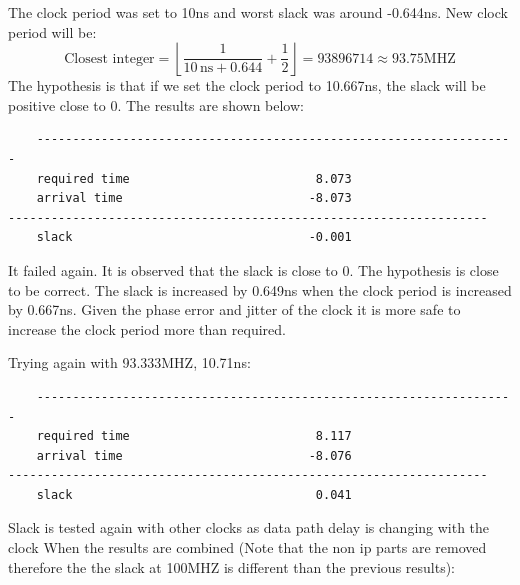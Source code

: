 \documentclass{report}
\begin{document}
The clock period was set to 10ns and worst slack was around -0.644ns. New clock period will be:
\[
\text{Closest integer} = \left\lfloor \frac{1}{10 \, \text{ns} + 0.644} + \frac{1}{2} \right\rfloor = 93896714 \approx 93.75 \text{MHZ}
\]
The hypothesis is that if we set the clock period to 10.667ns, the slack will be positive close to 0. The results are shown below:
\begin{verbatim}
    -------------------------------------------------------------------
    required time                          8.073    
    arrival time                          -8.073    
-------------------------------------------------------------------
    slack                                 -0.001
\end{verbatim}
It failed again. It is observed that the slack is close to 0. The hypothesis is close to be correct. The slack is increased by 0.649ns when the clock period is increased by 0.667ns. Given the phase error and jitter of the clock it is more safe to increase the clock period more than required.

Trying again with 93.333MHZ, 10.71ns:

\begin{verbatim}
    -------------------------------------------------------------------
    required time                          8.117    
    arrival time                          -8.076    
-------------------------------------------------------------------
    slack                                  0.041    
\end{verbatim}
Slack is tested again with other clocks as data path delay is changing with the clock When the results are combined (Note that the non ip parts are removed therefore the the slack at 100MHZ is different than the previous results):

\text{}
\end{document}
